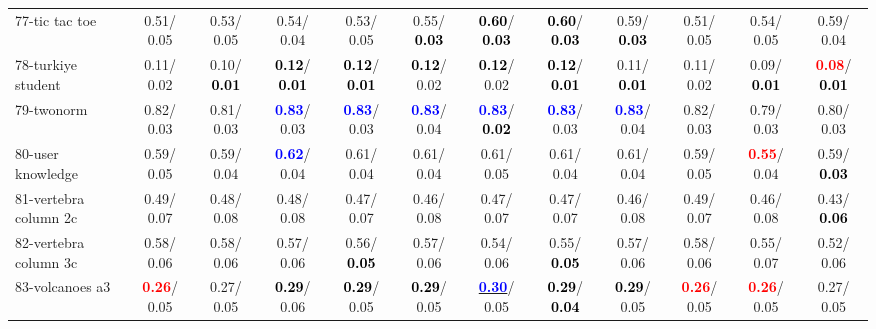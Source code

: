 \begin{table}[h]
\begin{center}
{\begin{tabular}{lc|c|c|c|c|c|c|c|c|c|c}
77-tic tac toe &   0.51/  0.05 &   0.53/  0.05 &   0.54/  0.04 &   0.53/  0.05 &   0.55/\textcolor{black}{\textbf{  0.03}} & \textcolor{black}{\textbf{  0.60}}/\textcolor{black}{\textbf{  0.03}} & \textcolor{black}{\textbf{  0.60}}/\textcolor{black}{\textbf{  0.03}} &   0.59/\textcolor{black}{\textbf{  0.03}} &   0.51/  0.05 &   0.54/  0.05 &   0.59/  0.04 \\
78-turkiye student &   0.11/  0.02 &   0.10/\textcolor{black}{\textbf{  0.01}} & \textcolor{black}{\textbf{  0.12}}/\textcolor{black}{\textbf{  0.01}} & \textcolor{black}{\textbf{  0.12}}/\textcolor{black}{\textbf{  0.01}} & \textcolor{black}{\textbf{  0.12}}/  0.02 & \textcolor{black}{\textbf{  0.12}}/  0.02 & \textcolor{black}{\textbf{  0.12}}/\textcolor{black}{\textbf{  0.01}} &   0.11/\textcolor{black}{\textbf{  0.01}} &   0.11/  0.02 &   0.09/\textcolor{black}{\textbf{  0.01}} & \textcolor{red}{\textbf{  0.08}}/\textcolor{black}{\textbf{  0.01}} \\ \hline
79-twonorm &   0.82/  0.03 &   0.81/  0.03 & \textcolor{blue}{\textbf{  0.83}}/  0.03 & \textcolor{blue}{\textbf{  0.83}}/  0.03 & \textcolor{blue}{\textbf{  0.83}}/  0.04 & \textcolor{blue}{\textbf{  0.83}}/\textcolor{black}{\textbf{  0.02}} & \textcolor{blue}{\textbf{  0.83}}/  0.03 & \textcolor{blue}{\textbf{  0.83}}/  0.04 &   0.82/  0.03 &   0.79/  0.03 &   0.80/  0.03 \\
80-user knowledge &   0.59/  0.05 &   0.59/  0.04 & \textcolor{blue}{\textbf{  0.62}}/  0.04 &   0.61/  0.04 &   0.61/  0.04 &   0.61/  0.05 &   0.61/  0.04 &   0.61/  0.04 &   0.59/  0.05 & \textcolor{red}{\textbf{  0.55}}/  0.04 &   0.59/\textcolor{black}{\textbf{  0.03}} \\
81-vertebra column 2c &   0.49/  0.07 &   0.48/  0.08 &   0.48/  0.08 &   0.47/  0.07 &   0.46/  0.08 &   0.47/  0.07 &   0.47/  0.07 &   0.46/  0.08 &   0.49/  0.07 &   0.46/  0.08 &   0.43/\textcolor{black}{\textbf{  0.06}} \\
82-vertebra column 3c &   0.58/  0.06 &   0.58/  0.06 &   0.57/  0.06 &   0.56/\textcolor{black}{\textbf{  0.05}} &   0.57/  0.06 &   0.54/  0.06 &   0.55/\textcolor{black}{\textbf{  0.05}} &   0.57/  0.06 &   0.58/  0.06 &   0.55/  0.07 &   0.52/  0.06 \\
83-volcanoes a3 & \textcolor{red}{\textbf{  0.26}}/  0.05 &   0.27/  0.05 & \textcolor{black}{\textbf{  0.29}}/  0.06 & \textcolor{black}{\textbf{  0.29}}/  0.05 & \textcolor{black}{\textbf{  0.29}}/  0.05 & \underline{\textcolor{blue}{\textbf{  0.30}}}/  0.05 & \textcolor{black}{\textbf{  0.29}}/\textcolor{black}{\textbf{  0.04}} & \textcolor{black}{\textbf{  0.29}}/  0.05 & \textcolor{red}{\textbf{  0.26}}/  0.05 & \textcolor{red}{\textbf{  0.26}}/  0.05 &   0.27/  0.05 \\

\end{tabular}}
\end{center}
\end{table}
